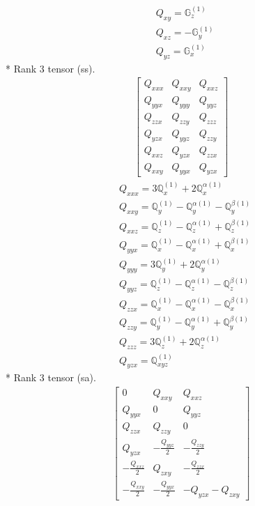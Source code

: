 \documentclass[fleqn,8pt,landscape]{jsarticle}
\begin{document}
\begin{align*}
& Q_{xy} = \mathbb{G}_{z}^{(1)} \\
& Q_{xz} = - \mathbb{G}_{y}^{(1)} \\
& Q_{yz} = \mathbb{G}_{x}^{(1)}
\end{align*}
* Rank 3 tensor (ss).
\begin{align*}
\begin{bmatrix} Q_{xxx} & Q_{xxy} & Q_{xxz} \\ Q_{yyx} & Q_{yyy} & Q_{yyz} \\ Q_{zzx} & Q_{zzy} & Q_{zzz} \\ Q_{yzx} & Q_{yyz} & Q_{zzy} \\ Q_{xxz} & Q_{yzx} & Q_{zzx} \\ Q_{xxy} & Q_{yyx} & Q_{yzx} \end{bmatrix}
\end{align*}
\begin{align*}
& Q_{xxx} = 3 \mathbb{Q}_{x}^{(1)} + 2 \mathbb{Q}_{x}^{\alpha(1)} \\
& Q_{xxy} = \mathbb{Q}_{y}^{(1)} - \mathbb{Q}_{y}^{\alpha(1)} - \mathbb{Q}_{y}^{\beta(1)} \\
& Q_{xxz} = \mathbb{Q}_{z}^{(1)} - \mathbb{Q}_{z}^{\alpha(1)} + \mathbb{Q}_{z}^{\beta(1)} \\
& Q_{yyx} = \mathbb{Q}_{x}^{(1)} - \mathbb{Q}_{x}^{\alpha(1)} + \mathbb{Q}_{x}^{\beta(1)} \\
& Q_{yyy} = 3 \mathbb{Q}_{y}^{(1)} + 2 \mathbb{Q}_{y}^{\alpha(1)} \\
& Q_{yyz} = \mathbb{Q}_{z}^{(1)} - \mathbb{Q}_{z}^{\alpha(1)} - \mathbb{Q}_{z}^{\beta(1)} \\
& Q_{zzx} = \mathbb{Q}_{x}^{(1)} - \mathbb{Q}_{x}^{\alpha(1)} - \mathbb{Q}_{x}^{\beta(1)} \\
& Q_{zzy} = \mathbb{Q}_{y}^{(1)} - \mathbb{Q}_{y}^{\alpha(1)} + \mathbb{Q}_{y}^{\beta(1)} \\
& Q_{zzz} = 3 \mathbb{Q}_{z}^{(1)} + 2 \mathbb{Q}_{z}^{\alpha(1)} \\
& Q_{yzx} = \mathbb{Q}_{xyz}^{(1)}
\end{align*}
* Rank 3 tensor (sa).
\begin{align*}
\begin{bmatrix} 0 & Q_{xxy} & Q_{xxz} \\ Q_{yyx} & 0 & Q_{yyz} \\ Q_{zzx} & Q_{zzy} & 0 \\ Q_{yzx} & - \frac{Q_{yyz}}{2} & - \frac{Q_{zzy}}{2} \\ - \frac{Q_{xxz}}{2} & Q_{zxy} & - \frac{Q_{zzx}}{2} \\ - \frac{Q_{xxy}}{2} & - \frac{Q_{yyx}}{2} & - Q_{yzx} - Q_{zxy} \end{bmatrix}
\end{align*}
\end{document}
